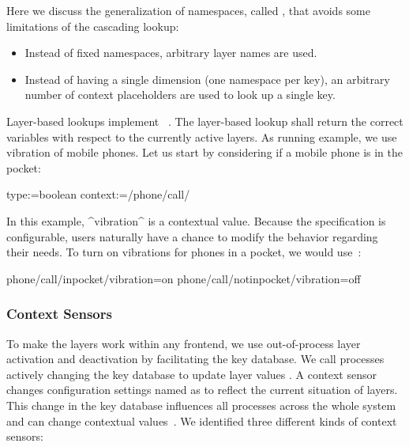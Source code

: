 Here we discuss the generalization of namespaces, called , that avoids some limitations of the cascading lookup:
\begin{itemize}
\item Instead of fixed namespaces, arbitrary layer names are used.
\item Instead of having a single dimension (one namespace per key), an arbitrary number of context placeholders are used to look up a single key.
\end{itemize}

Layer-based lookups implement ~\cite{tanter2008contextvalues}.
The layer-based lookup shall return the correct variables with respect to the currently active layers.
As running example, we use vibration of mobile phones.
Let us start by considering if a mobile phone is in the pocket:

\begin{code}
  type:=boolean
  context:=/phone/call/%
\end{code}

In this example, ^vibration^ is a contextual value.
Because the specification is configurable, users naturally have a chance to modify the behavior regarding their needs.
To turn on vibrations for phones in a pocket, we would use~\cite{raab2016unanticipated}:

\begin{code}[language=CfgElektra]
phone/call/inpocket/vibration=on
phone/call/notinpocket/vibration=off
\end{code}

\subsubsection{Context Sensors}
\label{sec:context-sensors}

To make the layers work within any frontend, we use out-of-process layer activation and deactivation by facilitating the key database.
We call processes actively changing the key database to update layer values .
A context sensor changes configuration settings named as  to reflect the current situation of layers.
This change in the key database influences all processes across the whole system and can change contextual values~\cite{raab2016unanticipated}.
We identified three different kinds of context sensors:

